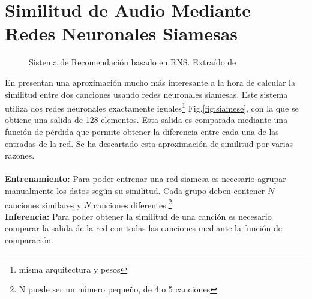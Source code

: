 
\section{Similitud de Audio Mediante Redes Neuronales Siamesas}

\begin{figure}
    \centering
    \centerfloat
    \label{fig:siamese}
    
    \caption{Sistema de Recomendación basado en RNS. Extraído de \cite{siamese}}
    \label{fig:my_label}
\end{figure}

En \cite{siamese} presentan una aproximación mucho más interesante a la hora de calcular la similitud entre dos canciones usando redes neuronales siamesas. Este sistema utiliza dos redes neuronales exactamente iguales\footnote{misma arquitectura y pesos} Fig.\ref{fig:siamese}, con la que se obtiene una salida de 128 elementos. Esta salida es comparada mediante una función de pérdida que permite obtener la diferencia entre cada una de las entradas de la red. Se ha descartado esta aproximación de similitud por varias razones.\\
\\
\textbf{Entrenamiento:} Para poder entrenar una red siamesa es necesario agrupar manualmente los datos según su similitud. Cada grupo deben contener $N$ canciones similares y $N$ canciones diferentes.\footnote{N puede ser un número pequeño, de 4 o 5 canciones}\\
\textbf{Inferencia:} Para poder obtener la similitud de una canción es necesario comparar la salida de la red con todas las canciones mediante la función de comparación.


